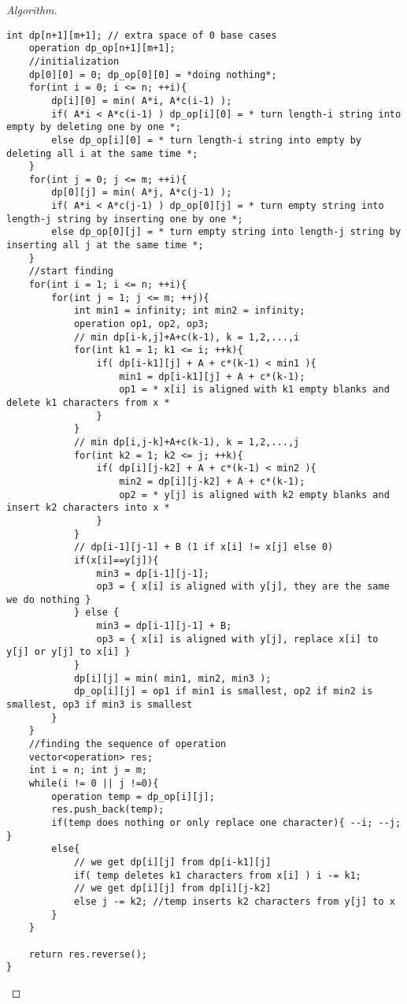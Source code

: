 \documentclass[openany]{article}
\begin{document}
\begin{proof}[Algorithm]{}
\begin{lstlisting}[basicstyle=\fontsize{8}{9}\selectfont\ttfamily]
    int dp[n+1][m+1]; // extra space of 0 base cases
    operation dp_op[n+1][m+1];
    //initialization
    dp[0][0] = 0; dp_op[0][0] = *doing nothing*;
    for(int i = 0; i <= n; ++i){
        dp[i][0] = min( A*i, A*c(i-1) );
        if( A*i < A*c(i-1) ) dp_op[i][0] = * turn length-i string into empty by deleting one by one *;
        else dp_op[i][0] = * turn length-i string into empty by deleting all i at the same time *;
    }
    for(int j = 0; j <= m; ++i){
        dp[0][j] = min( A*j, A*c(j-1) );
        if( A*i < A*c(j-1) ) dp_op[0][j] = * turn empty string into length-j string by inserting one by one *;
        else dp_op[0][j] = * turn empty string into length-j string by inserting all j at the same time *;
    }
    //start finding
    for(int i = 1; i <= n; ++i){
        for(int j = 1; j <= m; ++j){
            int min1 = infinity; int min2 = infinity;
            operation op1, op2, op3;
            // min dp[i-k,j]+A+c(k-1), k = 1,2,...,i
            for(int k1 = 1; k1 <= i; ++k){
                if( dp[i-k1][j] + A + c*(k-1) < min1 ){
                    min1 = dp[i-k1][j] + A + c*(k-1);
                    op1 = * x[i] is aligned with k1 empty blanks and delete k1 characters from x *
                }
            }
            // min dp[i,j-k]+A+c(k-1), k = 1,2,...,j
            for(int k2 = 1; k2 <= j; ++k){
                if( dp[i][j-k2] + A + c*(k-1) < min2 ){
                    min2 = dp[i][j-k2] + A + c*(k-1);
                    op2 = * y[j] is aligned with k2 empty blanks and insert k2 characters into x *
                }
            }
            // dp[i-1][j-1] + B (1 if x[i] != x[j] else 0)
            if(x[i]==y[j]){
                min3 = dp[i-1][j-1];
                op3 = { x[i] is aligned with y[j], they are the same we do nothing }
            } else {
                min3 = dp[i-1][j-1] + B;
                op3 = { x[i] is aligned with y[j], replace x[i] to y[j] or y[j] to x[i] }
            }
            dp[i][j] = min( min1, min2, min3 );
            dp_op[i][j] = op1 if min1 is smallest, op2 if min2 is smallest, op3 if min3 is smallest
        }
    }
    //finding the sequence of operation
    vector<operation> res;
    int i = n; int j = m;
    while(i != 0 || j !=0){
        operation temp = dp_op[i][j];
        res.push_back(temp);
        if(temp does nothing or only replace one character){ --i; --j; }
        else{
            // we get dp[i][j] from dp[i-k1][j]
            if( temp deletes k1 characters from x[i] ) i -= k1;
            // we get dp[i][j] from dp[i][j-k2]
            else j -= k2; //temp inserts k2 characters from y[j] to x
        }
    }
    
    return res.reverse();
}
		\end{lstlisting} 
\end{proof}
\end{document}
